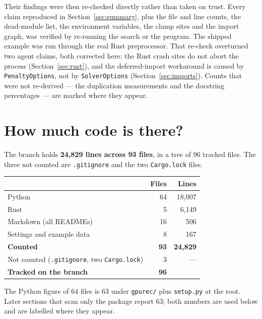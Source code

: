 \documentclass[11pt]{article}
\newcommand{\dir}[1]{\nolinkurl{#1}}
\begin{document}
Their findings were then re-checked directly rather than taken on trust.  Every
claim reproduced in Section~\ref{sec:summary}, plus the file and line counts,
the dead-module list, the environment variables, the clamp sites and the import
graph, was verified by re-running the search or the program.  The shipped
example was run through the real Rust preprocessor.  That re-check overturned
two agent claims, both corrected here: the Rust crash sites do not abort the
process (Section~\ref{sec:rust}), and the deferred-import workaround is caused
by \texttt{PenaltyOptions}, not by \texttt{SolverOptions}
(Section~\ref{sec:imports}).  Counts that were not re-derived --- the
duplication measurements and the docstring percentages --- are marked where
they appear.

\section{How much code is there?}

The branch holds \textbf{24,829 lines across 93 files}, in a tree of 96 tracked
files.  The three not counted are \dir{.gitignore} and the two
\dir{Cargo.lock} files.

\begin{center}
\begin{tabular}{@{}lrr@{}}
\toprule
& Files & Lines \\
\midrule
Python                            & 64 & 18{,}007 \\
Rust                              &  5 &  6{,}149 \\
Markdown (all READMEs)            & 16 &     506 \\
Settings and example data         &  8 &     167 \\
\midrule
\textbf{Counted}                  & \textbf{93} & \textbf{24{,}829} \\
Not counted (\dir{.gitignore}, two \dir{Cargo.lock}) & 3 & --- \\
\midrule
\textbf{Tracked on the branch}    & \textbf{96} & \\
\bottomrule
\end{tabular}
\end{center}

The Python figure of 64 files is 63 under \dir{gpurec/} plus \dir{setup.py} at
the root.  Later sections that scan only the package report 63; both numbers are
used below and are labelled where they appear.
\end{document}
